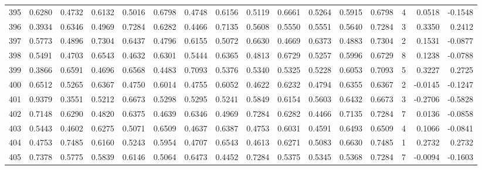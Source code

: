 \begin{tabular}{lrrrrrrrrrrrrrrr}
395 &      0.6280 &  0.4732 &  0.6132 &  0.5016 &  0.6798 &  0.4748 &  0.6156 &  0.5119 &  0.6661 &  0.5264 &   0.5915 &     0.6798 &      4 &                    0.0518 &                    -0.1548 \\
396 &      0.3934 &  0.6346 &  0.4969 &  0.7284 &  0.6282 &  0.4466 &  0.7135 &  0.5608 &  0.5550 &  0.5551 &   0.5640 &     0.7284 &      3 &                    0.3350 &                     0.2412 \\
397 &      0.5773 &  0.4896 &  0.7304 &  0.6437 &  0.4796 &  0.6155 &  0.5072 &  0.6630 &  0.4669 &  0.6373 &   0.4883 &     0.7304 &      2 &                    0.1531 &                    -0.0877 \\
398 &      0.5491 &  0.4703 &  0.6543 &  0.4632 &  0.6301 &  0.5444 &  0.6365 &  0.4813 &  0.6729 &  0.5257 &   0.5996 &     0.6729 &      8 &                    0.1238 &                    -0.0788 \\
399 &      0.3866 &  0.6591 &  0.4696 &  0.6568 &  0.4483 &  0.7093 &  0.5376 &  0.5340 &  0.5325 &  0.5228 &   0.6053 &     0.7093 &      5 &                    0.3227 &                     0.2725 \\
400 &      0.6512 &  0.5265 &  0.6367 &  0.4750 &  0.6014 &  0.4755 &  0.6052 &  0.4622 &  0.6232 &  0.4794 &   0.6355 &     0.6367 &      2 &                   -0.0145 &                    -0.1247 \\
401 &      0.9379 &  0.3551 &  0.5212 &  0.6673 &  0.5298 &  0.5295 &  0.5241 &  0.5849 &  0.6154 &  0.5603 &   0.6432 &     0.6673 &      3 &                   -0.2706 &                    -0.5828 \\
402 &      0.7148 &  0.6290 &  0.4820 &  0.6375 &  0.4639 &  0.6346 &  0.4969 &  0.7284 &  0.6282 &  0.4466 &   0.7135 &     0.7284 &      7 &                    0.0136 &                    -0.0858 \\
403 &      0.5443 &  0.4602 &  0.6275 &  0.5071 &  0.6509 &  0.4637 &  0.6387 &  0.4753 &  0.6031 &  0.4591 &   0.6493 &     0.6509 &      4 &                    0.1066 &                    -0.0841 \\
404 &      0.4753 &  0.7485 &  0.6160 &  0.5243 &  0.5954 &  0.4707 &  0.6543 &  0.4613 &  0.6271 &  0.5083 &   0.6630 &     0.7485 &      1 &                    0.2732 &                     0.2732 \\
405 &      0.7378 &  0.5775 &  0.5839 &  0.6146 &  0.5064 &  0.6473 &  0.4452 &  0.7284 &  0.5375 &  0.5345 &   0.5368 &     0.7284 &      7 &                   -0.0094 &                    -0.1603 \\

\end{tabular}
